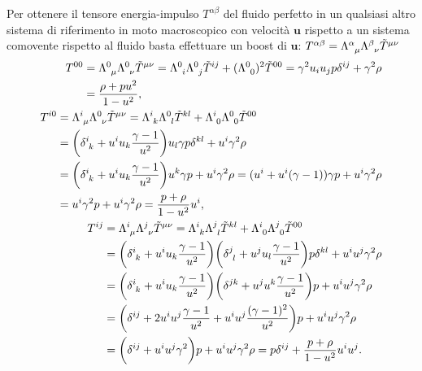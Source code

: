 Per ottenere il tensore energia-impulso $T^{\alpha\beta}$ del fluido perfetto in
un qualsiasi altro sistema di riferimento in moto macroscopico con velocità
$\bm{u}$ rispetto a un sistema comovente rispetto al fluido basta effettuare un
boost di $\bm{u}$:
$T^{\alpha\beta} =
\tensor{\Lambda}{^{\alpha}_{\mu}}\tensor{\Lambda}{^{\beta}_{\nu}}\tilde
T^{\mu\nu}$
\begin{subequations}
  \begin{align}
    \begin{split}
      T^{00} &= \tensor{\Lambda}{^{0}_{\mu}} \tensor{\Lambda}{^{0}_{\nu}} \tilde
      T^{\mu\nu} = \tensor{\Lambda}{^{0}_{i}} \tensor{\Lambda}{^{0}_{j}} \tilde
      T^{ij} + (\tensor{\Lambda}{^{0}_{0}})^{2} \tilde{T}^{00} = \gamma^{2} u_{i}
      u_{j} p \delta^{ij} + \gamma^{2} \rho \\
      &= \frac{\rho +pu^{2}}{1-u^{2}},
    \end{split} \\
    \begin{split}
      T^{i0} &= \tensor{\Lambda}{^{i}_{\mu}} \tensor{\Lambda}{^{0}_{\nu}} \tilde
      T^{\mu\nu} = \tensor{\Lambda}{^{i}_{k}} \tensor{\Lambda}{^{0}_{l}} \tilde
      T^{kl} + \tensor{\Lambda}{^{i}_{0}} \tensor{\Lambda}{^{0}_{0}} \tilde
      T^{00} \\
      &= \bigg(\tensor{\delta}{^{i}_{k}} + u^{i}u_{k}\frac{\gamma -
        1}{u^{2}}\bigg) u_{l} \gamma p \delta^{kl} + u^{i} \gamma^{2} \rho \\
      &= \bigg(\tensor{\delta}{^{i}_{k}} + u^{i}u_{k}\frac{\gamma -
        1}{u^{2}}\bigg) u^{k} \gamma p + u^{i} \gamma^{2} \rho = (u^{i} +
      u^{i}(\gamma - 1)) \gamma p + u^{i} \gamma^{2} \rho \\
      &= u^{i}\gamma^{2} p + u^{i} \gamma^{2} \rho = \frac{p + \rho}{1 -
        u^{2}}u^{i},
    \end{split} \\
    \begin{split}
      T^{ij} &= \tensor{\Lambda}{^{i}_{\mu}} \tensor{\Lambda}{^{j}_{\nu}} \tilde
      T^{\mu\nu} = \tensor{\Lambda}{^{i}_{k}} \tensor{\Lambda}{^{j}_{l}} \tilde
      T^{kl} + \tensor{\Lambda}{^{i}_{0}} \tensor{\Lambda}{^{j}_{0}} \tilde
      T^{00} \\
      &= \bigg(\tensor{\delta}{^{i}_{k}} + u^{i}u_{k}\frac{\gamma -
        1}{u^{2}}\bigg) \bigg(\tensor{\delta}{^{j}_{l}} + u^{j}u_{l}\frac{\gamma
        - 1}{u^{2}}\bigg) p \delta^{kl} + u^{i}u^{j} \gamma^{2} \rho \\
      &= \bigg(\tensor{\delta}{^{i}_{k}} + u^{i}u_{k}\frac{\gamma -
        1}{u^{2}}\bigg) \bigg(\delta^{jk} + u^{j}u^{k}\frac{\gamma -
        1}{u^{2}}\bigg) p + u^{i}u^{j} \gamma^{2} \rho \\
      &= \bigg(\delta^{ij} + 2 u^{i}u^{j} \frac{\gamma - 1}{u^{2}} +
      u^{i}u^{j}\frac{(\gamma - 1)^{2}}{u^{2}}\bigg)p + u^{i}u^{j} \gamma^{2}
      \rho \\
      &= \bigg(\delta^{ij} + u^{i}u^{j}\gamma^{2}\bigg)p + u^{i}u^{j} \gamma^{2}
      \rho = p \delta^{ij} + \frac{p + \rho}{1 - u^{2}}u^{i}u^{j}.
    \end{split}
  \end{align}
\end{subequations}
